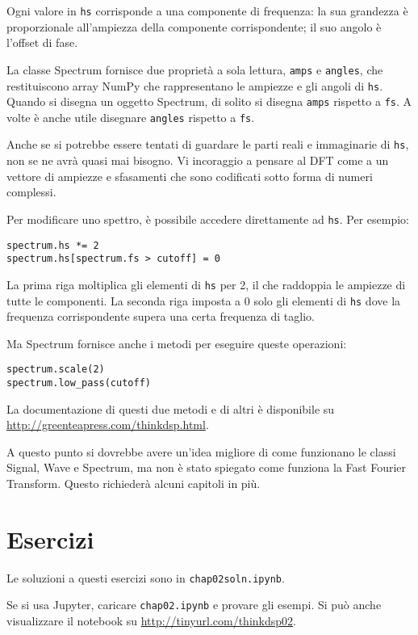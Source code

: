 \documentclass[12pt,a4paper]{book}
\begin{document}
Ogni valore in {\tt hs} corrisponde a una componente di frequenza: la sua grandezza è proporzionale all'ampiezza della componente corrispondente; il suo angolo è l'offset di fase.

La classe Spectrum fornisce due proprietà a sola lettura, {\tt amps} e {\tt angles}, che restituiscono array NumPy che rappresentano le ampiezze e gli angoli di {\tt hs}. Quando si disegna un oggetto Spectrum, di solito si disegna {\tt amps} rispetto a {\tt fs}. A volte è anche utile disegnare {\tt angles} rispetto a {\tt fs}.

Anche se si potrebbe essere tentati di guardare le parti reali e immaginarie di {\tt hs}, non se ne avrà quasi mai bisogno. Vi incoraggio a pensare al DFT come a un vettore di ampiezze e sfasamenti che sono codificati sotto forma di numeri complessi.

Per modificare uno spettro, è possibile accedere direttamente ad {\tt hs}. Per esempio:

\begin{verbatim} 
spectrum.hs *= 2
spectrum.hs[spectrum.fs > cutoff] = 0
 \end{verbatim} 

La prima riga moltiplica gli elementi di {\tt hs} per 2, il che raddoppia le ampiezze di tutte le componenti. La seconda riga imposta a 0 solo gli elementi di {\tt hs} dove la frequenza corrispondente supera una certa frequenza di taglio.

Ma Spectrum fornisce anche i metodi per eseguire queste operazioni:

\begin{verbatim} 
spectrum.scale(2)
spectrum.low_pass(cutoff)
 \end{verbatim} 

La documentazione di questi due metodi e di altri è disponibile su \url{http://greenteapress.com/thinkdsp.html}.

A questo punto si dovrebbe avere un'idea migliore di come funzionano le classi Signal, Wave e Spectrum, ma non è stato spiegato come funziona la Fast Fourier Transform. Questo richiederà alcuni capitoli in più.

\section{Esercizi} 

Le soluzioni a questi esercizi sono in {\tt chap02soln.ipynb}.

\begin{exercise} Se si usa Jupyter, caricare {\tt chap02.ipynb} e provare gli esempi. Si può anche visualizzare il notebook su \url{http://tinyurl.com/thinkdsp02}. \end{exercise} 
\end{document}
